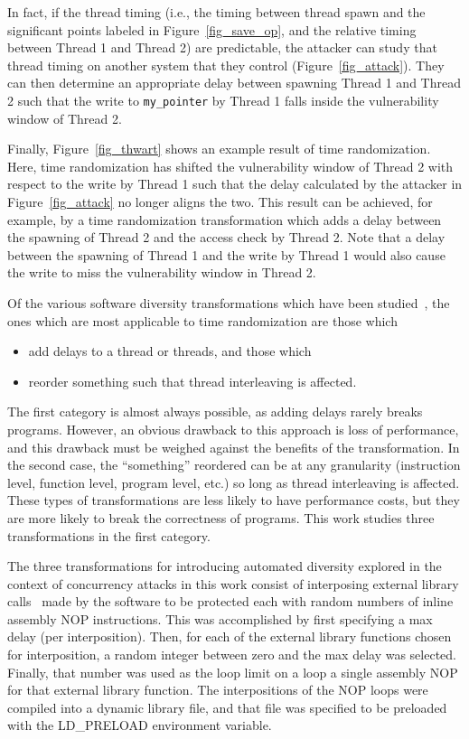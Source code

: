 In fact, if the thread timing (i.e., the timing between thread spawn and the significant points labeled in Figure~\ref{fig_save_op}, and the relative timing between Thread 1 and Thread 2) are predictable, the attacker can study that thread timing on another system that they control (Figure~\ref{fig_attack}).
They can then determine an appropriate delay between spawning Thread 1 and Thread 2 such that the write to \texttt{my\_pointer} by Thread 1 falls inside the vulnerability window of Thread 2.

Finally, Figure~\ref{fig_thwart} shows an example result of time randomization.
Here, time randomization has shifted the vulnerability window of Thread 2 with respect to the write by Thread 1 such that the delay calculated by the attacker in Figure~\ref{fig_attack} no longer aligns the two.
This result can be achieved, for example, by a time randomization transformation which adds a delay between the spawning of Thread 2 and the access check by Thread 2.
Note that a delay between the spawning of Thread 1 and the write by Thread 1 would also cause the write to miss the vulnerability window in Thread 2.

Of the various software diversity transformations which have been studied~\cite{Larsen2014}, the ones which are most applicable to time randomization are those which
\begin{itemize}
	\item add delays to a thread or threads, and those which
	\item reorder something such that thread interleaving is affected.
\end{itemize}
The first category is almost always possible, as adding delays rarely breaks programs.
However, an obvious drawback to this approach is loss of performance, and this drawback must be weighed against the benefits of the transformation.
In the second case, the ``something'' reordered can be at any granularity (instruction level, function level, program level, etc.) so long as thread interleaving is affected.
These types of transformations are less likely to have performance costs, but they are more likely to break the correctness of programs.
This work studies three transformations in the first category.

The three transformations for introducing automated diversity explored in the context of concurrency attacks in this work consist of interposing external library calls~\cite{Conrad2009} made by the software to be protected each with random numbers of inline assembly NOP instructions.
This was accomplished by first specifying a max delay (per interposition).
Then, for each of the external library functions chosen for interposition, a random integer between zero and the max delay was selected.
Finally, that number was used as the loop limit on a loop a single assembly NOP for that external library function.
The interpositions of the NOP loops were compiled into a dynamic library file, and that file was specified to be preloaded with the LD\_PRELOAD environment variable.

